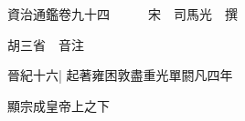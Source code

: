 






























































資治通鑑卷九十四　　　宋　司馬光　撰

胡三省　音注

晉紀十六|{
	起著雍困敦盡重光單閼凡四年}


顯宗成皇帝上之下

